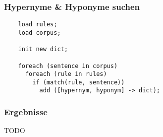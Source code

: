 \begin{frame}[fragile]
  \frametitle{Hypernyme \& Hyponyme suchen}

  \begin{lstlisting}
    load rules;
    load corpus;

    init new dict;

    foreach (sentence in corpus)
      foreach (rule in rules)
        if (match(rule, sentence))
          add ([hypernym, hyponym] -> dict);
  \end{lstlisting}
\end{frame}

\begin{frame}
  \frametitle{Ergebnisse}

  TODO
\end{frame}